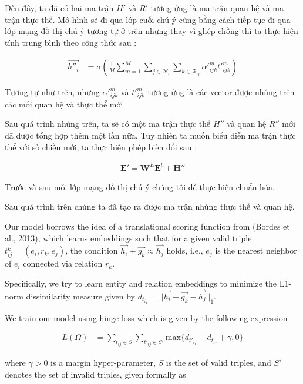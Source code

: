 Đến đây, ta đã có hai ma trận $H'$ và $R'$ tương ứng là ma trận quan hệ và ma trận thực thể. Mô hình sẽ đi qua lớp cuối chú ý cùng bằng cách tiếp tục đi qua lớp mạng đồ thị chú ý tương tự ở trên nhưng thay vì ghép chồng thì ta thực hiện tính trung bình theo công thức sau :

\begin{align}
{\overrightarrow{h''_{i}}}&={\sigma\left(\frac{1}{M} \sum_{m=1}^{M} \sum_{j \in \mathcal{N}_i} \sum_{k \in \mathcal{R}_{ij}} \alpha'^m_{ijk} t'^m_{ijk}\right)}
\end{align}

Tương tự như trên, nhưng $\alpha'^m_{ijk}$ và $t'^m_{ijk}$ tương ứng là các vector được nhúng trên các mối quan hệ và thực thể mới.

Sau quá trình nhúng trên, ta sẽ có một ma trận thực thể $H''$ và quan hệ $R''$ mới đã được tổng hợp thêm một lần nữa. Tuy nhiên ta muốn biểu diễn ma trận thực thể với số chiều mới, ta thực hiện phép biến đổi sau :


\begin{align}
\mathbf{E'} = \mathbf{W}^E \mathbf{E}^t + \mathbf{H''}
\end{align}

Trước và sau mỗi lớp mạng đồ thị chú ý chúng tôi đề thực hiện chuẩn hóa.


Sau quá trình trên chúng ta đã tạo ra được ma trận nhúng thực thể và quan hệ. 

Our model borrows the idea of a translational
scoring function from (Bordes et al., 2013), which
learns embeddings such that for a given valid triple $t^k_{ij} = (e_i, r_k, e_j)$, the condition $\vec{h_i}+\vec{g_k} \approx \vec{h_j}$ holds, i.e., $e_j$ is the nearest neighbor of $e_i$ connected via relation $r_k$.

 Specifically, we try to learn entity and relation embeddings to minimize the L1-norm dissimilarity measure given by $d_{t_{ij}} = \big|\big|\vec{h_i}+ \vec{g_k}-\vec{h_j}\big|\big|_1$.

We train our model using hinge-loss which is
given by the following expression


\begin{align}
{L(\Omega)}&={\sum_{t_{ij} \in S} \sum_{t'_{ij} \in S'} \text{max}\{d_{t'_{ij}} - d_{t_{ij}} + \gamma , 0 \}}
\end{align}

where $\gamma > 0$ is a margin hyper-parameter, $S$ is the set of valid triples, and $S'$ denotes the set of invalid
triples, given formally as

